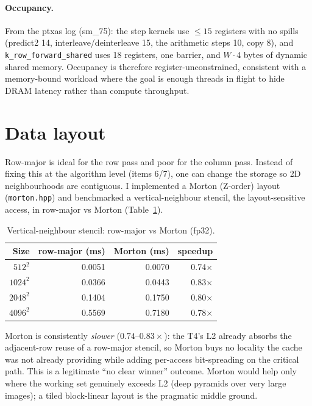 \documentclass[11pt]{article}
\newcommand{\code}[1]{\texttt{#1}}
\begin{document}
\paragraph{Occupancy.}
From the ptxas log (sm\_75): the step kernels use $\le 15$ registers with no
spills (predict2 14, interleave/deinterleave 15, the arithmetic steps 10, copy 8),
and \code{k\_row\_forward\_shared} uses 18 registers, one barrier, and $W\cdot4$
bytes of dynamic shared memory. Occupancy is therefore register-unconstrained,
consistent with a memory-bound workload where the goal is enough threads in flight
to hide DRAM latency rather than compute throughput.

\section{Data layout}
\label{sec:layout}
Row-major is ideal for the row pass and poor for the column pass. Instead of
fixing this at the algorithm level (items 6/7), one can change the storage so 2D
neighbourhoods are contiguous. I implemented a Morton (Z-order) layout
(\code{morton.hpp}) and benchmarked a vertical-neighbour stencil, the
layout-sensitive access, in row-major vs Morton (Table~\ref{tab:morton}).

\begin{table}[h]
\centering\small
\begin{tabular}{@{}rrrr@{}}
\toprule
Size & row-major (ms) & Morton (ms) & speedup \\
\midrule
$512^2$  & 0.0051 & 0.0070 & 0.74$\times$ \\
$1024^2$ & 0.0366 & 0.0443 & 0.83$\times$ \\
$2048^2$ & 0.1404 & 0.1750 & 0.80$\times$ \\
$4096^2$ & 0.5569 & 0.7180 & 0.78$\times$ \\
\bottomrule
\end{tabular}
\caption{Vertical-neighbour stencil: row-major vs Morton (fp32).}
\label{tab:morton}
\end{table}

\noindent
Morton is consistently \emph{slower} ($0.74$--$0.83\times$): the T4's L2 already
absorbs the adjacent-row reuse of a row-major stencil, so Morton buys no locality
the cache was not already providing while adding per-access bit-spreading on the
critical path. This is a legitimate ``no clear winner'' outcome. Morton would help
only where the working set genuinely exceeds L2 (deep pyramids over very large
images); a tiled block-linear layout is the pragmatic middle ground.
\end{document}
